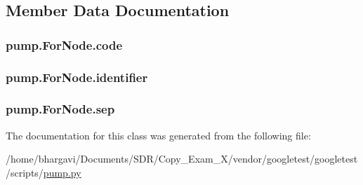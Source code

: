 \subsection{Member Data Documentation}
\subsubsection[{\texorpdfstring{code}{code}}]{\setlength{\rightskip}{0pt plus 5cm}pump.\+For\+Node.\+code}\hypertarget{classpump_1_1_for_node_afdb5f4f2a3bc772bbc6ea777dfde898e}{}\label{classpump_1_1_for_node_afdb5f4f2a3bc772bbc6ea777dfde898e}
\subsubsection[{\texorpdfstring{identifier}{identifier}}]{\setlength{\rightskip}{0pt plus 5cm}pump.\+For\+Node.\+identifier}\hypertarget{classpump_1_1_for_node_a2444199e135e43696b3a006bd0d38982}{}\label{classpump_1_1_for_node_a2444199e135e43696b3a006bd0d38982}
\subsubsection[{\texorpdfstring{sep}{sep}}]{\setlength{\rightskip}{0pt plus 5cm}pump.\+For\+Node.\+sep}\hypertarget{classpump_1_1_for_node_a06b493278b3c1ad53363a2bcc3b8efb3}{}\label{classpump_1_1_for_node_a06b493278b3c1ad53363a2bcc3b8efb3}


The documentation for this class was generated from the following file\+:\begin{DoxyCompactItemize}
\item 
/home/bhargavi/\+Documents/\+S\+D\+R/\+Copy\+\_\+\+Exam\+\_\+X/vendor/googletest/googletest/scripts/\hyperlink{pump_8py}{pump.\+py}\end{DoxyCompactItemize}
